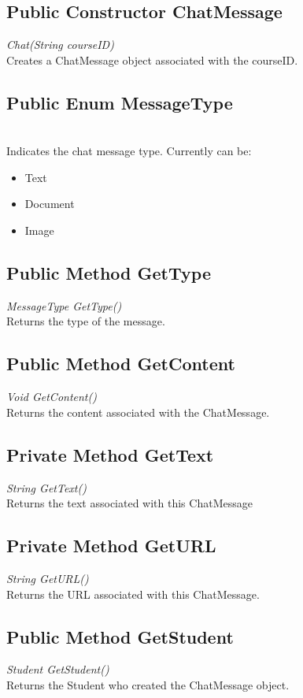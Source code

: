 \documentclass[16pt]{scrreprt}
\begin{document}
\subsection{Public Constructor ChatMessage}
\textit{Chat(String courseID)} \\
Creates a ChatMessage object associated with the courseID.

\subsection{Public Enum MessageType}
\textit{} \\
Indicates the chat message type. Currently can be:
\begin{itemize}
	\item Text
	\item Document
	\item Image
\end{itemize}

\subsection{Public Method GetType}
\textit{MessageType GetType()} \\
Returns the type of the message.

\subsection{Public Method GetContent}
\textit{Void GetContent()} \\
Returns the content associated with the ChatMessage.

\subsection{Private Method GetText}
\textit{String GetText()} \\
Returns the text associated with this ChatMessage

\subsection{Private Method GetURL}
\textit{String GetURL()} \\
Returns the URL associated with this ChatMessage.

\subsection{Public Method GetStudent}
\textit{Student GetStudent()} \\
Returns the Student who created the ChatMessage object.
\end{document}
